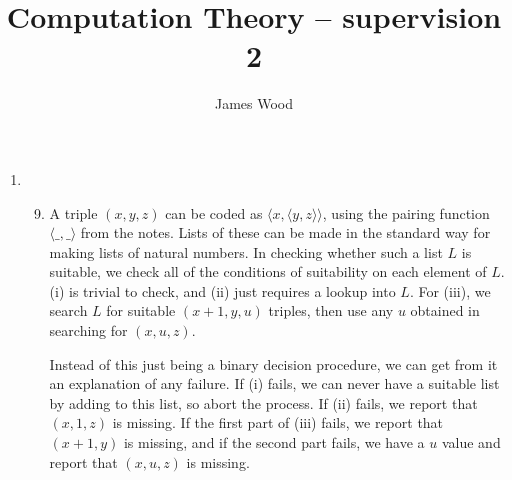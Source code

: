 \documentclass{article}
\begin{document}
\title{Computation Theory -- supervision 2}
\author{James Wood}
\maketitle

\begin{enumerate}
  \item
    \begin{enumerate}[label=\arabic*.]
        \setcounter{enumii}{8}
      \item
        A triple $(x, y, z)$ can be coded as $\langle x, \langle y, z \rangle \rangle$, using the pairing function $\langle \_, \_ \rangle$ from the notes. Lists of these can be made in the standard way for making lists of natural numbers. In checking whether such a list $L$ is suitable, we check all of the conditions of suitability on each element of $L$. (i) is trivial to check, and (ii) just requires a lookup into $L$. For (iii), we search $L$ for suitable $(x + 1, y, u)$ triples, then use any $u$ obtained in searching for $(x, u, z)$.

        Instead of this just being a binary decision procedure, we can get from it an explanation of any failure. If (i) fails, we can never have a suitable list by adding to this list, so abort the process. If (ii) fails, we report that $(x, 1, z)$ is missing. If the first part of (iii) fails, we report that $(x + 1, y)$ is missing, and if the second part fails, we have a $u$ value and report that $(x, u, z)$ is missing.


\end{enumerate}
\end{enumerate}
\end{document}

